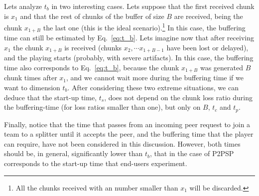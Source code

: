 Lets analyze $t_b$ in two interesting cases. Lets suppose that the
first received chunk is $x_1$ and that the rest of chunks of the
buffer of size $B$ are received, being the chunk $x_{1+B}$ the last
one (this is the ideal scenario).\footnote{All the chunks received
  with an number smaller than $x_1$ will be discarded.} In this case,
the buffering time can still be estimated by Eq.~\ref{eq:t_b}. Lets
imagine now that after receiving $x_1$ the chunk $x_{1+B}$ is received
(chunks $x_2, \cdots x_{1+B-1}$ have been lost or delayed), and the
playing starts (probably, with severe artifacts). In this case, the
buffering time also corresponds to Eq.~\ref{eq:t_b}, because the chunk
$x_{1+B}$ was generated $B$ chunk times after $x_1$, and we cannot
wait more during the buffering time if we want to dimension
$t_b$. After considering these two extreme situations, we can deduce
that the start-up time, $t_s$, does not depend on the chunk loss ratio
during the buffering-time (for loss ratios smaller than one), but only
on $B$, $t_c$ and $t_p$.

Finally, notice that the time that passes from an incoming peer
request to join a team to a splitter until it accepts the peer, and
the buffering time that the player can require, have not been
considered in this discussion. However, both times should be, in
general, significantly lower than $t_b$, that in the case of P2PSP
corresponds to the start-up time that end-users experiment.

